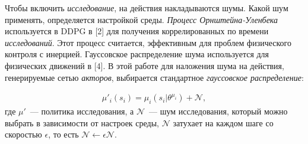 Чтобы включить \textit{исследование}, на действия накладываются шумы. Какой шум применять, определяется настройкой среды. \textit{Процесс Орнштейна-Уленбека} используется в DDPG в [2] для получения коррелированных по времени \textit{исследований}. Этот процесс считается, эффективным для проблем физического контроля с инерцией. Гауссовское распределение шума используется для физических движений в [4]. В этой работе для наложения шума на действия, генерируемые сетью \textit{акторов}, выбирается стандартное \textit{гауссовское распределение}:

\begin{equation}
    \begin{multlined}
        \mu'_i(s_i) = \mu_i(s_i|\theta^{\mu_i}) + \mathcal{N},
    \end{multlined}
\end{equation}
где $\mu'$~--- политика исследования, а $\mathcal{N}$~--- шум исследования, который можно выбрать в зависимости от настроек среды, $\mathcal{N}$ затухает на каждом шаге со скоростью $\epsilon$, то есть $\mathcal{N} \leftarrow \epsilon \mathcal{N}$.
